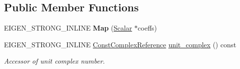 \subsection*{Public Member Functions}
\begin{DoxyCompactItemize}
\item 
E\+I\+G\+E\+N\+\_\+\+S\+T\+R\+O\+N\+G\+\_\+\+I\+N\+L\+I\+NE {\bfseries Map} (\hyperlink{class_sophus_1_1_s_o2_group_base_a075b701502715aecf0bdb3464963d36c}{Scalar} $\ast$coeffs)\hypertarget{class_eigen_1_1_map_3_01_sophus_1_1_s_o2_group_3_01___scalar_01_4_00_01___options_01_4_a8d91e157d048d775c835066cd8ebbc3c}{}\label{class_eigen_1_1_map_3_01_sophus_1_1_s_o2_group_3_01___scalar_01_4_00_01___options_01_4_a8d91e157d048d775c835066cd8ebbc3c}

\item 
E\+I\+G\+E\+N\+\_\+\+S\+T\+R\+O\+N\+G\+\_\+\+I\+N\+L\+I\+NE \hyperlink{class_sophus_1_1_s_o2_group_base_a077856f95a5c02933efd03aa1393825f}{Const\+Complex\+Reference} \hyperlink{class_eigen_1_1_map_3_01_sophus_1_1_s_o2_group_3_01___scalar_01_4_00_01___options_01_4_af4497aa46d2216a58be7e674109c8b30}{unit\+\_\+complex} () const 
\begin{DoxyCompactList}\small\item\em Accessor of unit complex number. \end{DoxyCompactList}\end{DoxyCompactItemize}
